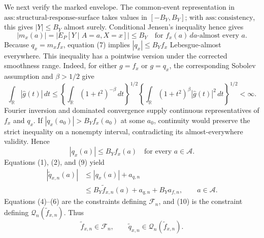 We next verify the marked envelope.  The common-event representation in
\(\mathrm{ass{:}structural\text{-}response\text{-}surface}\) takes values
in \([-B_Y,B_Y]\); with \(\mathrm{ass{:}consistency}\), this gives
\(|Y|\le B_Y\) almost surely.  Conditional Jensen's inequality hence gives
\[
 |m_x(a)|=|E_P[Y\mid A=a,X=x]|\le B_Y
 \quad\text{for }f_x(a)\,da\text{-almost every }a.                  \tag{7}
\]
Because \(q_x=m_xf_x\), equation (7) implies
\(|q_x|\le B_Yf_x\) Lebesgue-almost everywhere.  This inequality has a
pointwise version under the corrected smoothness range.  Indeed, for either
\(g=f_x\) or \(g=q_x\), the corresponding Sobolev assumption and
\(\beta>1/2\) give
\[
 \int_{\mathbb R}|\widehat g(t)|\,dt
 \le
 \left\{\int_{\mathbb R}(1+t^2)^{-\beta}\,dt\right\}^{1/2}
 \left\{\int_{\mathbb R}(1+t^2)^\beta
                    |\widehat g(t)|^2\,dt\right\}^{1/2}<\infty.     \tag{8}
\]
Fourier inversion and dominated convergence supply continuous
representatives of \(f_x\) and \(q_x\).  If
\(|q_x(a_0)|>B_Yf_x(a_0)\) at some \(a_0\), continuity would preserve the
strict inequality on a nonempty interval, contradicting its almost-everywhere
validity.  Hence
\[
 |q_x(a)|\le B_Yf_x(a)\quad\text{for every }a\in\mathcal A.         \tag{9}
\]
Equations (1), (2), and (9) yield
\[
 \begin{aligned}
 |\widetilde q_{x,n}(a)|
 &\le|q_x(a)|+a_{q,n}\\
 &\le B_Y\widetilde f_{x,n}(a)+a_{q,n}+B_Ya_{f,n},
 \qquad a\in\mathcal A.                                           \tag{10}
 \end{aligned}
\]
Equations (4)--(6) are the constraints defining \(\mathscr F_n\), and (10)
is the constraint defining
\(\mathscr Q_n(\widetilde f_{x,n})\).  Thus
\[
 \widetilde f_{x,n}\in\mathscr F_n,
 \qquad
 \widetilde q_{x,n}\in\mathscr Q_n(\widetilde f_{x,n}).           \tag{11}
\]

